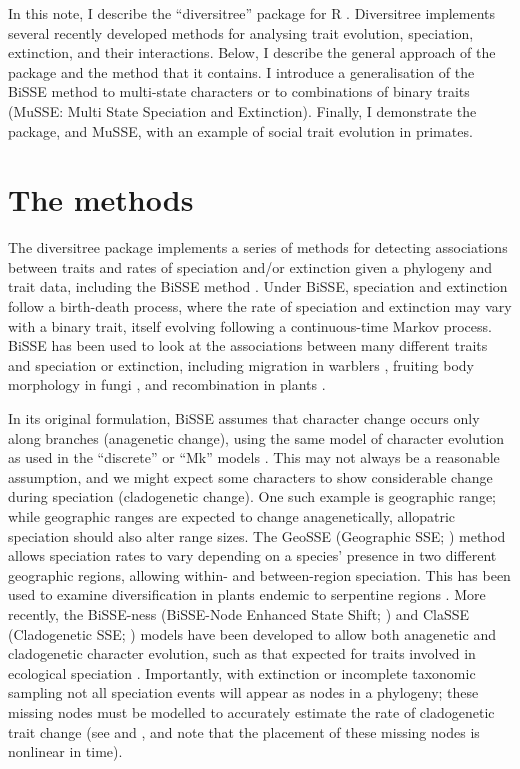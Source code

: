 \documentclass[12pt]{article}
\begin{document}
In this note, I describe the ``diversitree'' package for R \citep{R}.
Diversitree implements several recently developed methods for
analysing trait evolution, speciation, extinction, and their
interactions.  Below, I describe the general approach of the package
and the method that it contains.  I introduce a generalisation of the
BiSSE method to multi-state characters or to combinations of binary
traits (MuSSE: Multi State Speciation and Extinction).  Finally, I
demonstrate the package, and MuSSE, with an example of social trait
evolution in primates.

\section{The methods}
The diversitree package implements a series of methods for detecting
associations between traits and rates of speciation and/or extinction
given a phylogeny and trait data, including the BiSSE method
\citep{Maddison-2007-701}.
%
Under BiSSE, speciation and extinction follow a birth-death process,
where the rate of speciation and extinction may vary with a binary
trait, itself evolving following a continuous-time Markov process.
%
BiSSE has been used to look at the associations between many different
traits and speciation or extinction, including
%
migration in warblers \citep{Winger-2012-610}, %
fruiting body morphology in fungi \citep{Wilson-2011-1305}, %
and recombination in plants \citep{Johnson-2011-3230}.

In its original formulation, BiSSE assumes that character change
occurs only along branches (anagenetic change), using the same model
of character evolution as used in the ``discrete''
\citep{Pagel-1994-37} or ``Mk'' models \citep{Lewis-2001-913}.
%
This may not always be a reasonable assumption, and we might expect
some characters to show considerable change during speciation
(cladogenetic change).
%
One such example is geographic range; while geographic ranges are
expected to change anagenetically, allopatric speciation should also
alter range sizes.  The GeoSSE (Geographic SSE;
\citealp{Goldberg-2011-451}) method allows speciation rates to vary
depending on a species' presence in two different geographic regions,
allowing within- and between-region speciation.  This has been used to
examine diversification in plants endemic to serpentine regions
\citep{Anacker-2010-365}.
%
More recently, the BiSSE-ness (BiSSE-Node Enhanced State Shift;
\citealp{Magnuson-Ford-2012}) and ClaSSE (Cladogenetic SSE;
\citealp{Goldberg-classe}) models have been developed to allow both
anagenetic and cladogenetic character evolution, such as that expected
for traits involved in ecological speciation
\citep{Schluter-2009-737}.
%
Importantly, with extinction or incomplete taxonomic sampling not all
speciation events will appear as nodes in a phylogeny; these missing
nodes must be modelled to accurately estimate the rate of cladogenetic
trait change (see \citealp{Nee-1994-305} and
\citealp{Bokma-2008-2718}, and note that the placement of these
missing nodes is nonlinear in time).
\end{document}
